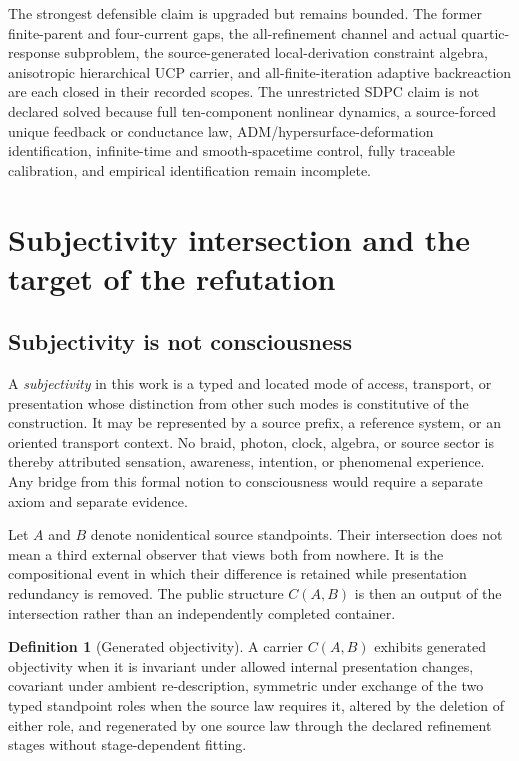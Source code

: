 \documentclass[11pt]{article}
\theoremstyle{definition}
\newtheorem{definition}[theorem]{Definition}
\theoremstyle{remark}
\begin{document}
The strongest defensible claim is upgraded but remains bounded. The former finite-parent and four-current gaps, the all-refinement channel and actual quartic-response subproblem, the source-generated local-derivation constraint algebra, anisotropic hierarchical UCP carrier, and all-finite-iteration adaptive backreaction are each closed in their recorded scopes. The unrestricted SDPC claim is not declared solved because full ten-component nonlinear dynamics, a source-forced unique feedback or conductance law, ADM/hypersurface-deformation identification, infinite-time and smooth-spacetime control, fully traceable calibration, and empirical identification remain incomplete.

\section{Subjectivity intersection and the target of the refutation}

\subsection{Subjectivity is not consciousness}

A \emph{subjectivity} in this work is a typed and located mode of access, transport, or presentation whose distinction from other such modes is constitutive of the construction. It may be represented by a source prefix, a reference system, or an oriented transport context. No braid, photon, clock, algebra, or source sector is thereby attributed sensation, awareness, intention, or phenomenal experience. Any bridge from this formal notion to consciousness would require a separate axiom and separate evidence.

Let $A$ and $B$ denote nonidentical source standpoints. Their intersection does not mean a third external observer that views both from nowhere. It is the compositional event in which their difference is retained while presentation redundancy is removed. The public structure $C(A,B)$ is then an output of the intersection rather than an independently completed container.

\begin{definition}[Generated objectivity]
A carrier $C(A,B)$ exhibits generated objectivity when it is invariant under allowed internal presentation changes, covariant under ambient re-description, symmetric under exchange of the two typed standpoint roles when the source law requires it, altered by the deletion of either role, and regenerated by one source law through the declared refinement stages without stage-dependent fitting.
\end{definition}
\end{document}
